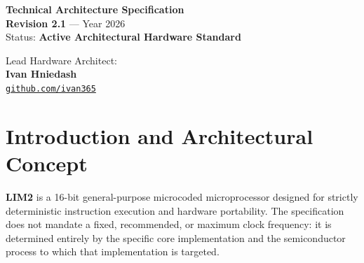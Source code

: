 \documentclass[11pt,a4paper]{article}
\begin{document}
\begin{titlepage}
\noindent
\begin{tcolorbox}[
    enhanced,
    colback=limpaper,
    colframe=limborder,
    boxrule=0.8pt,
    arc=5pt,
    left=16pt,right=16pt,top=12pt,bottom=12pt
]
    \begin{minipage}[c]{0.58\textwidth}
        {\large\bfseries\color{limdark}Technical Architecture Specification}\\[2pt]
        {\footnotesize\textcolor{limorangeaccent}{\textbf{Revision 2.1}} --- Year 2026}\\[3pt]
        {\footnotesize\color{limmuted}Status: \textbf{Active Architectural Hardware Standard}}
    \end{minipage}\hfill
    \begin{minipage}[c]{0.38\textwidth}
        \raggedleft
        {\footnotesize\color{limmuted}Lead Hardware Architect:}\\[1pt]
        {\normalsize\bfseries\color{limdark}Ivan Hniedash}\\[2pt]
        {\footnotesize\href{https://github.com/ivan365}{\color{limorange}\texttt{github.com/ivan365}}}
    \end{minipage}
\end{tcolorbox}

\vspace*{0.02\textheight}
\end{titlepage}

\hypersetup{pageanchor=true}
\tableofcontents
\clearpage
{}

\section{Introduction and Architectural Concept}

\textbf{LIM2} is a 16-bit general-purpose microcoded microprocessor designed for strictly deterministic instruction execution and hardware portability. The specification does not mandate a fixed, recommended, or maximum clock frequency: it is determined entirely by the specific core implementation and the semiconductor process to which that implementation is targeted.
\end{document}
